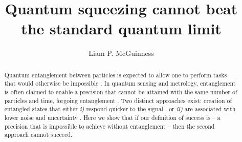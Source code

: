 \documentclass[reqno]{amsart}
\begin{document}
\title{Quantum squeezing cannot beat the standard quantum limit}

\maketitle
\begin{centering}
\author{Liam P. McGuinness}\\
\address{Laser Physics Centre, Research School of Physics, Australian National University, Acton,}\\
\address{Australian Capital Territory 2601, Australia}\\
\\
\end{centering}

\begin{abstract}
Quantum entanglement between particles is expected to allow one to perform tasks that would otherwise be impossible \cite{Bell1964,Feynman1982,Deutsch1985, Shor1994, Giovannetti2001}. In quantum sensing and metrology, entanglement is often claimed to enable a precision that cannot be attained with the same number of particles and time, forgoing entanglement \cite{Helstrom1969, Holevo1973a, Giovannetti2004, Giovannetti2006, DemkowiczDobrzanski2012, Zwierz2012, Pezze2018}. %
Two distinct approaches exist: %
creation of entangled states that either \emph{i)} respond quicker to the signal%
, or \emph{ii)} are associated with lower noise and uncertainty%
. Here we show that if our definition of success is -- a precision that is impossible to achieve without entanglement -- then the second approach cannot succeed.\\
\end{abstract}
\end{document}
